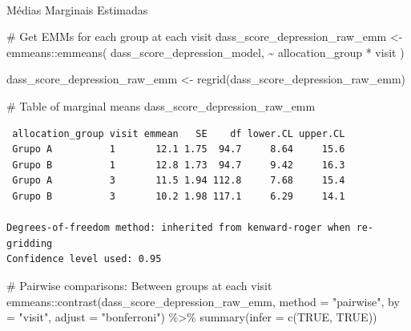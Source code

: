 \documentclass[
  letterpaper,
  DIV=11,
  numbers=noendperiod]{scrartcl}
\makeatletter
\let\oldparagraph\paragraph
\renewcommand{\paragraph}{
    \@ifstar
      \xxxParagraphStar
      \xxxParagraphNoStar
  }
\newcommand{\xxxParagraphStar}[1]{\oldparagraph*{#1}\mbox{}}
\newcommand{\xxxParagraphNoStar}[1]{\oldparagraph{#1}\mbox{}}
\newenvironment{Shaded}{\begin{snugshade}}{\end{snugshade}}
\newcommand{\AttributeTok}[1]{\textcolor[rgb]{0.40,0.45,0.13}{#1}}
\newcommand{\CommentTok}[1]{\textcolor[rgb]{0.37,0.37,0.37}{#1}}
\newcommand{\ConstantTok}[1]{\textcolor[rgb]{0.56,0.35,0.01}{#1}}
\newcommand{\FunctionTok}[1]{\textcolor[rgb]{0.28,0.35,0.67}{#1}}
\newcommand{\NormalTok}[1]{\textcolor[rgb]{0.00,0.23,0.31}{#1}}
\newcommand{\OtherTok}[1]{\textcolor[rgb]{0.00,0.23,0.31}{#1}}
\newcommand{\SpecialCharTok}[1]{\textcolor[rgb]{0.37,0.37,0.37}{#1}}
\newcommand{\StringTok}[1]{\textcolor[rgb]{0.13,0.47,0.30}{#1}}
\makeatother
\begin{document}
\paragraph{Médias Marginais
Estimadas}\label{muxe9dias-marginais-estimadas-22}

\begin{Shaded}
\begin{Highlighting}[]
\CommentTok{\# Get EMMs for each group at each visit}
\NormalTok{dass\_score\_depression\_raw\_emm }\OtherTok{\textless{}{-}}\NormalTok{ emmeans}\SpecialCharTok{::}\FunctionTok{emmeans}\NormalTok{(}
\NormalTok{    dass\_score\_depression\_model, }
    \SpecialCharTok{\textasciitilde{}}\NormalTok{ allocation\_group }\SpecialCharTok{*}\NormalTok{ visit}
\NormalTok{)}

\NormalTok{dass\_score\_depression\_raw\_emm }\OtherTok{\textless{}{-}} \FunctionTok{regrid}\NormalTok{(dass\_score\_depression\_raw\_emm)}

\CommentTok{\# Table of marginal means}
\NormalTok{dass\_score\_depression\_raw\_emm}
\end{Highlighting}
\end{Shaded}

\begin{verbatim}
 allocation_group visit emmean   SE    df lower.CL upper.CL
 Grupo A          1       12.1 1.75  94.7     8.64     15.6
 Grupo B          1       12.8 1.73  94.7     9.42     16.3
 Grupo A          3       11.5 1.94 112.8     7.68     15.4
 Grupo B          3       10.2 1.98 117.1     6.29     14.1

Degrees-of-freedom method: inherited from kenward-roger when re-gridding 
Confidence level used: 0.95 
\end{verbatim}

\begin{Shaded}
\begin{Highlighting}[]
\CommentTok{\# Pairwise comparisons: Between groups at each visit}
\NormalTok{emmeans}\SpecialCharTok{::}\FunctionTok{contrast}\NormalTok{(dass\_score\_depression\_raw\_emm, }\AttributeTok{method =} \StringTok{"pairwise"}\NormalTok{, }\AttributeTok{by =} \StringTok{"visit"}\NormalTok{, }\AttributeTok{adjust =} \StringTok{"bonferroni"}\NormalTok{) }\SpecialCharTok{\%\textgreater{}\%} \FunctionTok{summary}\NormalTok{(}\AttributeTok{infer =} \FunctionTok{c}\NormalTok{(}\ConstantTok{TRUE}\NormalTok{, }\ConstantTok{TRUE}\NormalTok{))}
\end{Highlighting}
\end{Shaded}
\end{document}
